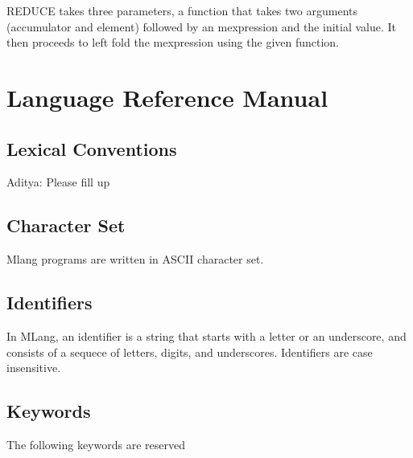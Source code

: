 \documentclass[letterpaper,11pt]{article}
\begin{document}
{\begin{lstlisting}
\end{lstlisting}
REDUCE takes three parameters, a function that takes two arguments (accumulator and element) followed by an mexpression and the initial value.
It then proceeds to left fold the mexpression using the given function.

		      
\section{Language Reference Manual}


\subsection{Lexical Conventions}

 Aditya: Please fill up


\subsection{Character Set}


Mlang programs are written in ASCII character set.


\subsection{Identifiers}

In MLang, an identifier is a string that starts with a letter or an underscore, and consists
of a sequece of letters, digits, and underscores. Identifiers are case insensitive.


\subsection{Keywords}


The following keywords are reserved 


}
\end{document}
